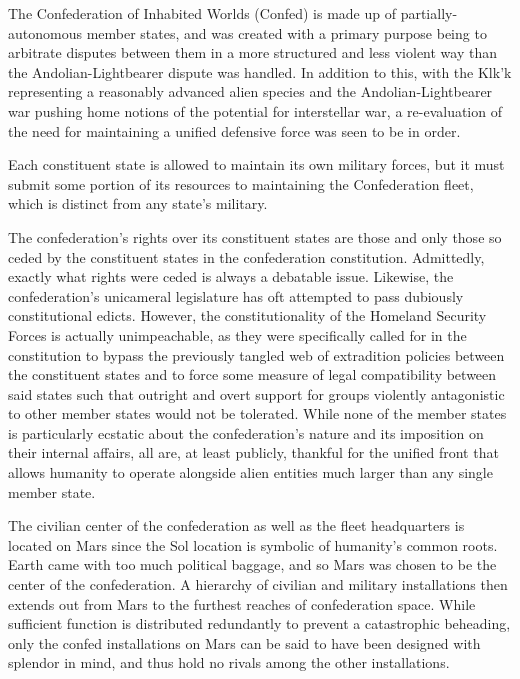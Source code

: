 The Confederation of Inhabited Worlds (Confed) is made up of
partially-autonomous member states, and was created with a primary
purpose being to arbitrate disputes between them in a more structured
and less violent way than the Andolian-Lightbearer dispute was
handled. In addition to this, with the Klk'k representing a reasonably
advanced alien species and the Andolian-Lightbearer war pushing home
notions of the potential for interstellar war, a re-evaluation of the
need for maintaining a unified defensive force was seen to be in
order.

Each constituent state is allowed to maintain its own military forces,
but it must submit some portion of its resources to maintaining the
Confederation fleet, which is distinct from any state's military.

The confederation's rights over its constituent states are those and
only those so ceded by the constituent states in the confederation
constitution. Admittedly, exactly what rights were ceded is always a
debatable issue. Likewise, the confederation's unicameral legislature
has oft attempted to pass dubiously constitutional edicts. However,
the constitutionality of the Homeland Security Forces is actually
unimpeachable, as they were specifically called for in the
constitution to bypass the previously tangled web of extradition
policies between the constituent states and to force some measure of
legal compatibility between said states such that outright and overt
support for groups violently antagonistic to other member states would
not be tolerated. While none of the member states is particularly
ecstatic about the confederation's nature and its imposition on their
internal affairs, all are, at least publicly, thankful for the unified
front that allows humanity to operate alongside alien entities much
larger than any single member state.

The civilian center of the confederation as well as the fleet
headquarters is located on Mars since the Sol location is symbolic of
humanity's common roots. Earth came with too much political baggage,
and so Mars was chosen to be the center of the confederation. A
hierarchy of civilian and military installations then extends out from
Mars to the furthest reaches of confederation space. While sufficient
function is distributed redundantly to prevent a catastrophic
beheading, only the confed installations on Mars can be said to have
been designed with splendor in mind, and thus hold no rivals among the
other installations.




